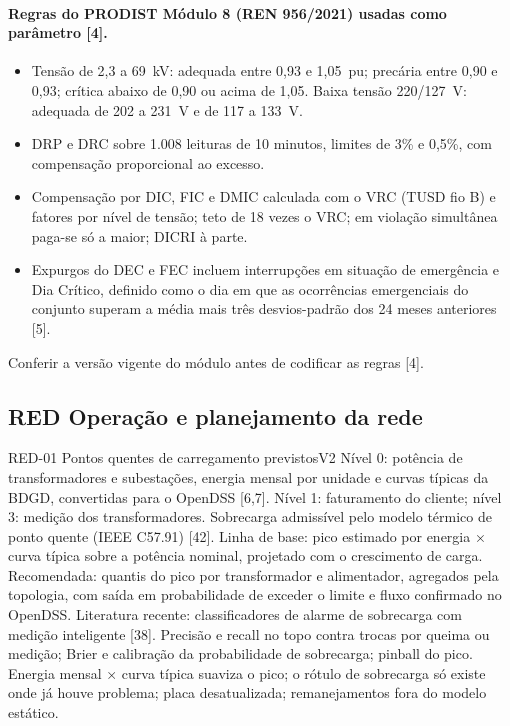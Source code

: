 \paragraph{Regras do PRODIST Módulo 8 (REN 956/2021) usadas como parâmetro [4].}
\begin{itemize}
  \item Tensão de 2,3 a 69~kV: adequada entre 0,93 e 1,05~pu; precária entre
    0,90 e 0,93; crítica abaixo de 0,90 ou acima de 1,05. Baixa tensão
    220/127~V: adequada de 202 a 231~V e de 117 a 133~V.
  \item DRP e DRC sobre 1.008 leituras de 10 minutos, limites de 3\% e 0,5\%,
    com compensação proporcional ao excesso.
  \item Compensação por DIC, FIC e DMIC calculada com o VRC (TUSD fio B) e
    fatores por nível de tensão; teto de 18 vezes o VRC; em violação
    simultânea paga-se só a maior; DICRI à parte.
  \item Expurgos do DEC e FEC incluem interrupções em situação de emergência
    e Dia Crítico, definido como o dia em que as ocorrências emergenciais do
    conjunto superam a média mais três desvios-padrão dos 24 meses anteriores
    [5].
\end{itemize}
Conferir a versão vigente do módulo antes de codificar as regras [4].

\subsection{RED \textperiodcentered{} Operação e planejamento da rede}

\begin{ficha}{RED-01 \textperiodcentered{} Pontos quentes de carregamento previstos}{V2}
 Nível 0: potência de transformadores e subestações, energia
mensal por unidade e curvas típicas da BDGD, convertidas para o OpenDSS [6,7].
Nível 1: faturamento do cliente; nível 3: medição dos transformadores.
Sobrecarga admissível pelo modelo térmico de ponto quente (IEEE C57.91) [42].
 Linha de base: pico estimado por energia × curva típica
sobre a potência nominal, projetado com o crescimento de carga. Recomendada:
quantis do pico por transformador e alimentador, agregados pela topologia,
com saída em probabilidade de exceder o limite e fluxo confirmado no
OpenDSS. Literatura recente: classificadores de alarme de sobrecarga com medição
inteligente [38].
 Precisão e recall no topo contra trocas por queima ou
medição; Brier e calibração da probabilidade de sobrecarga; pinball do pico.
 Energia mensal × curva típica suaviza o pico; o rótulo de
sobrecarga só existe onde já houve problema; placa desatualizada; remanejamentos
fora do modelo estático.
\end{ficha}

